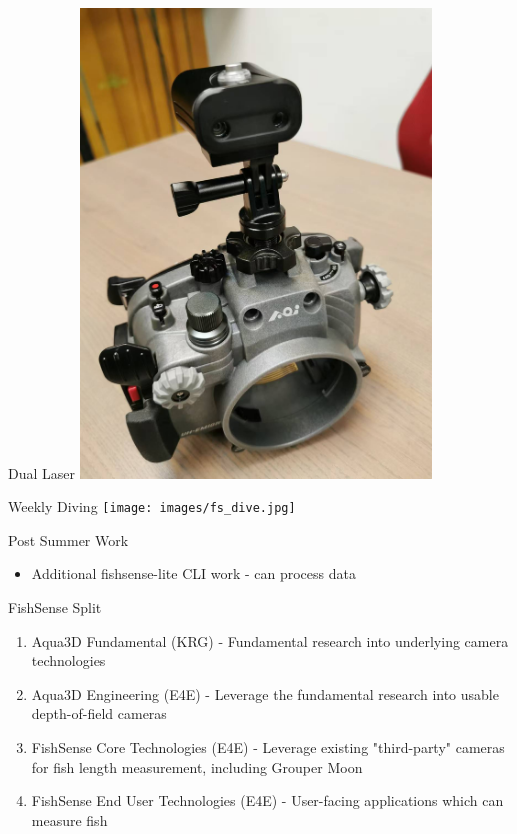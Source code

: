 \begin{frame}{Dual Laser}
    \centering
    \includegraphics[height=0.7\textheight,width=0.7\textwidth,keepaspectratio]{images/fs_duallaser.jpg}
\end{frame}

\begin{frame}{Weekly Diving}
    \centering
    \texttt{[image: images/fs\_dive.jpg]}
\end{frame}

\begin{frame}{Post Summer Work}
    \begin{itemize}
        \item Additional fishsense-lite CLI work - can process data
    \end{itemize}
\end{frame}

\begin{frame}{FishSense Split}
    \begin{enumerate}
        \item Aqua3D Fundamental (KRG) - Fundamental research into underlying camera technologies
        \item Aqua3D Engineering (E4E) - Leverage the fundamental research into usable depth-of-field cameras
        \item FishSense Core Technologies (E4E) - Leverage existing "third-party" cameras for fish length measurement, including Grouper Moon
        \item FishSense End User Technologies (E4E) - User-facing applications which can measure fish
    \end{enumerate}
\end{frame}


